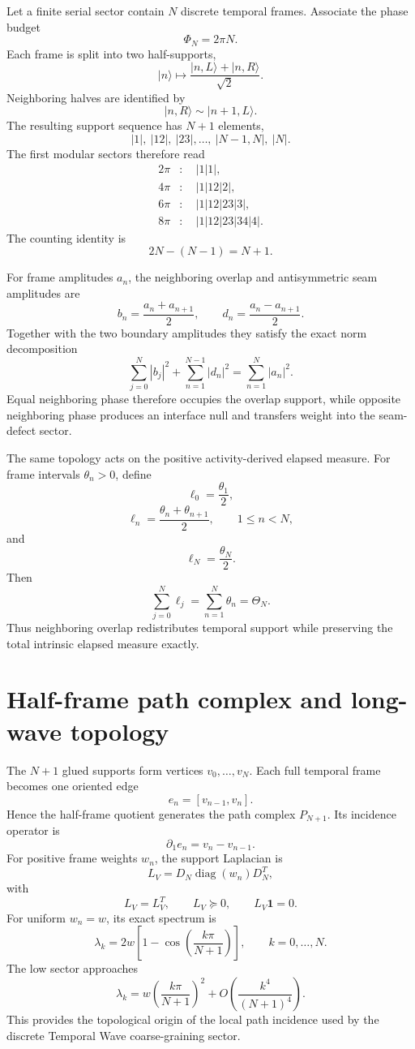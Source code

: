 Let a finite serial sector contain $N$ discrete temporal frames. Associate the phase budget
\[
\boxed{\Phi_N=2\pi N.}
\]
Each frame is split into two half-supports,
\[
\boxed{
|n\rangle
\mapsto
\frac{|n,L\rangle+|n,R\rangle}{\sqrt2}.
}
\]
Neighboring halves are identified by
\[
\boxed{|n,R\rangle\sim|n+1,L\rangle.}
\]
The resulting support sequence has $N+1$ elements,
\[
\boxed{
|1|,\ |12|,\ |23|,\ldots,\ |N-1,N|,\ |N|.
}
\]
The first modular sectors therefore read
\[
\begin{aligned}
2\pi &: \quad |1|1|,\\
4\pi &: \quad |1|12|2|,\\
6\pi &: \quad |1|12|23|3|,\\
8\pi &: \quad |1|12|23|34|4|.
\end{aligned}
\]
The counting identity is
\[
\boxed{2N-(N-1)=N+1.}
\]

For frame amplitudes $a_n$, the neighboring overlap and antisymmetric seam amplitudes are
\[
\boxed{
b_n=\frac{a_n+a_{n+1}}2,
\qquad
d_n=\frac{a_n-a_{n+1}}2.
}
\]
Together with the two boundary amplitudes they satisfy the exact norm decomposition
\[
\boxed{
\sum_{j=0}^{N}|b_j|^2
+\sum_{n=1}^{N-1}|d_n|^2
=\sum_{n=1}^{N}|a_n|^2.
}
\]
Equal neighboring phase therefore occupies the overlap support, while opposite neighboring phase produces an interface null and transfers weight into the seam-defect sector.

The same topology acts on the positive activity-derived elapsed measure. For frame intervals $\theta_n>0$, define
\[
\boxed{\ell_0=\frac{\theta_1}{2},}
\]
\[
\boxed{\ell_n=\frac{\theta_n+\theta_{n+1}}2,
\qquad 1\le n<N,}
\]
and
\[
\boxed{\ell_N=\frac{\theta_N}{2}.}
\]
Then
\[
\boxed{
\sum_{j=0}^{N}\ell_j
=\sum_{n=1}^{N}\theta_n
=\Theta_N.
}
\]
Thus neighboring overlap redistributes temporal support while preserving the total intrinsic elapsed measure exactly.

\section{Half-frame path complex and long-wave topology}

The $N+1$ glued supports form vertices $v_0,\ldots,v_N$. Each full temporal frame becomes one oriented edge
\[
\boxed{e_n=[v_{n-1},v_n].}
\]
Hence the half-frame quotient generates the path complex $P_{N+1}$. Its incidence operator is
\[
\boxed{\partial_1 e_n=v_n-v_{n-1}.}
\]
For positive frame weights $w_n$, the support Laplacian is
\[
\boxed{
L_V=D_N\operatorname{diag}(w_n)D_N^T,
}
\]
with
\[
L_V=L_V^T,
\qquad
L_V\succeq0,
\qquad
L_V\mathbf1=0.
\]
For uniform $w_n=w$, its exact spectrum is
\[
\boxed{
\lambda_k
=2w\left[1-\cos\left(\frac{k\pi}{N+1}\right)\right],
\qquad k=0,\ldots,N.
}
\]
The low sector approaches
\[
\boxed{
\lambda_k
=w\left(\frac{k\pi}{N+1}\right)^2
+O\!\left(\frac{k^4}{(N+1)^4}\right).
}
\]
This provides the topological origin of the local path incidence used by the discrete Temporal Wave coarse-graining sector.


